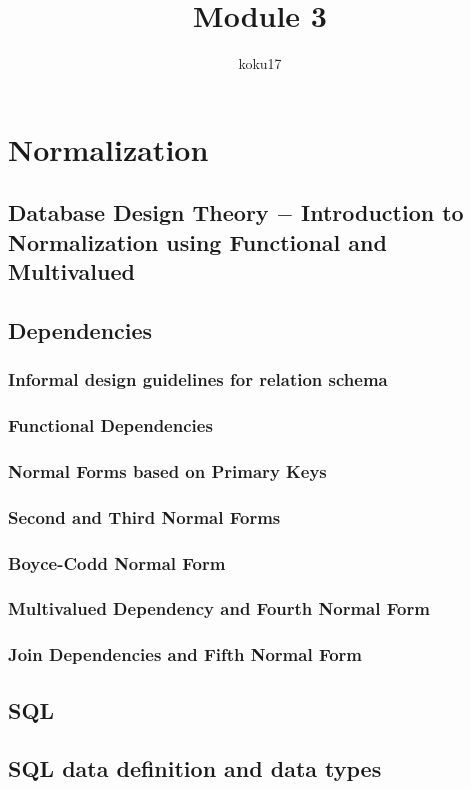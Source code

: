 \documentclass{article}
\title{Module 3}
\author{koku17}
\begin{document}
	\maketitle \thispagestyle{empty} \newpage
	\tableofcontents \thispagestyle{empty} \newpage
	\section{Normalization}
	\subsection{Database Design Theory $-$ Introduction to Normalization using Functional and Multivalued}
	\subsection{Dependencies}
	\subsubsection{Informal design guidelines for relation schema}
	\subsubsection{Functional Dependencies}
	\subsubsection{Normal Forms based on Primary Keys}
	\subsubsection{Second and Third Normal Forms}
	\subsubsection{Boyce-Codd Normal Form}
	\subsubsection{Multivalued Dependency and Fourth Normal Form}
	\subsubsection{Join Dependencies and Fifth Normal Form}

	\subsection{SQL}
	\subsection{SQL data definition and data types}
\end{document}
